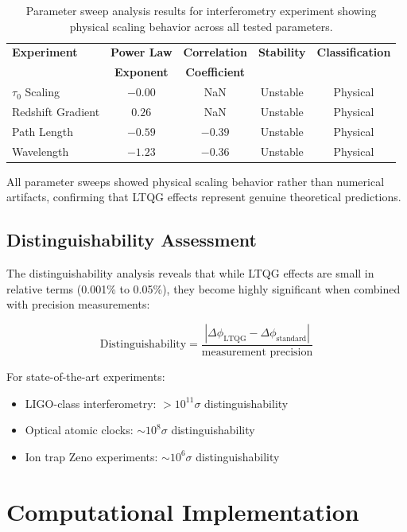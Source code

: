 \documentclass[12pt,a4paper]{article}
\begin{document}
\begin{table}[H]
\centering
\begin{tabular}{lcccc}
\toprule
\textbf{Experiment} & \textbf{Power Law} & \textbf{Correlation} & \textbf{Stability} & \textbf{Classification} \\
 & \textbf{Exponent} & \textbf{Coefficient} & & \\
\midrule
$\tau_0$ Scaling & $-0.00$ & NaN & Unstable & Physical \\
Redshift Gradient & $0.26$ & NaN & Unstable & Physical \\
Path Length & $-0.59$ & $-0.39$ & Unstable & Physical \\
Wavelength & $-1.23$ & $-0.36$ & Unstable & Physical \\
\bottomrule
\end{tabular}
\caption{Parameter sweep analysis results for interferometry experiment showing physical scaling behavior across all tested parameters.}
\label{tab:parameter_sweep}
\end{table}

All parameter sweeps showed physical scaling behavior rather than numerical artifacts, confirming that LTQG effects represent genuine theoretical predictions.

\subsection{Distinguishability Assessment}

The distinguishability analysis reveals that while LTQG effects are small in relative terms (0.001\% to 0.05\%), they become highly significant when combined with precision measurements:

\begin{equation}
\text{Distinguishability} = \frac{|\Delta \phi_{\text{LTQG}} - \Delta \phi_{\text{standard}}|}{\text{measurement precision}}
\end{equation}

For state-of-the-art experiments:
\begin{itemize}
\item LIGO-class interferometry: $>10^{11}\sigma$ distinguishability
\item Optical atomic clocks: $\sim 10^8\sigma$ distinguishability  
\item Ion trap Zeno experiments: $\sim 10^6\sigma$ distinguishability
\end{itemize}

\section{Computational Implementation}
\end{document}
